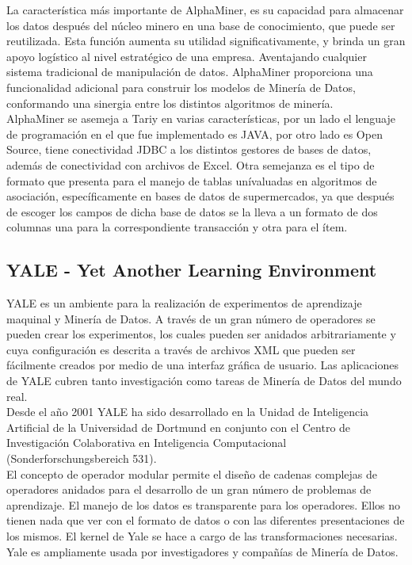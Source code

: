 La caracter\'istica m\'as importante de AlphaMiner, es su capacidad para almacenar los datos despu\'es del
n\'ucleo minero en una base de conocimiento, que puede ser reutilizada. Esta funci\'on aumenta su utilidad
significativamente, y  brinda un gran apoyo log\'istico al nivel estrat\'egico de una empresa. Aventajando
cualquier sistema tradicional de manipulaci\'on de datos. AlphaMiner proporciona una funcionalidad adicional para
construir los modelos de Miner\'ia de Datos, conformando una sinergia entre los distintos algoritmos de
miner\'ia.\\

AlphaMiner se asemeja a Tariy en varias caracter\'isticas, por un lado el lenguaje de programaci\'on en el que
fue implementado es JAVA, por otro lado es Open Source, tiene conectividad JDBC a los distintos gestores de bases
de datos, adem\'as de conectividad con archivos de Excel. Otra semejanza es el tipo de formato que presenta para
el manejo de  tablas un\'ivaluadas en algoritmos de asociaci\'on, espec\'ificamente en bases de datos de
supermercados, ya que despu\'es de escoger los campos de dicha base de datos se la lleva a un formato de dos
columnas una para la correspondiente transacci\'on y otra para el \'item.

\subsection{YALE - Yet Another Learning Environment}

YALE \cite{yalew, yalep} es un ambiente para la realizaci\'on de experimentos de aprendizaje maquinal y Miner\'ia
de Datos.  A trav\'es de un gran n\'umero de operadores se pueden crear los experimentos, los cuales pueden ser
anidados arbitrariamente y cuya configuraci\'on es descrita a trav\'es de archivos XML que pueden ser
f\'acilmente creados por medio de una interfaz gr\'afica de usuario.  Las aplicaciones de YALE cubren tanto
investigaci\'on como tareas de Miner\'ia de Datos del mundo real.\\

Desde el a\~no 2001 YALE ha sido desarrollado en la Unidad de Inteligencia Artificial de la Universidad de
Dortmund \cite{dort} en conjunto con el Centro de Investigaci\'on Colaborativa en Inteligencia Computacional
(Sonderforschungsbereich 531).\\

El concepto de operador modular permite el dise\~no de cadenas complejas de operadores anidados para el
desarrollo de un gran n\'umero de problemas de aprendizaje. El manejo de los datos es transparente para los
operadores. Ellos no tienen nada que ver con el formato de datos o con las diferentes presentaciones de los
mismos. El kernel de Yale se hace a cargo de las transformaciones necesarias.  Yale es ampliamente usada por
investigadores y compa\~n\'ias de Miner\'ia de Datos.

